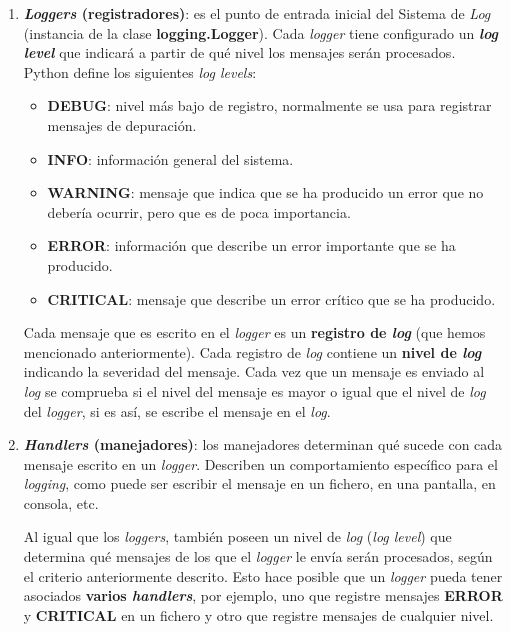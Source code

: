     \begin{enumerate}
        \item \textbf{\textit{Loggers} (registradores)}: es el punto de entrada inicial del
        Sistema de \textit{Log} (instancia de la clase \textbf{logging.Logger}). Cada
        \textit{logger} tiene configurado un \textbf{\textit{log level}} que indicará a
        partir de qué nivel los mensajes serán procesados. Python define los siguientes
        \textit{log levels}:

            \begin{itemize}
                \item \textbf{DEBUG}: nivel más bajo de registro, normalmente se usa para
                registrar mensajes de depuración.
                \item \textbf{INFO}: información general del sistema.
                \item \textbf{WARNING}: mensaje que indica que se ha producido un error
                que no debería ocurrir, pero que es de poca importancia.
                \item \textbf{ERROR}: información que describe un error importante que se
                ha producido.
                \item \textbf{CRITICAL}: mensaje que describe un error crítico que se
                ha producido.
            \end{itemize}

        Cada mensaje que es escrito en el \textit{logger} es un \textbf{registro de
        \textit{log}} (que hemos mencionado anteriormente). Cada registro de \textit{log}
        contiene un \textbf{nivel de \textit{log}} indicando la severidad del mensaje. Cada
        vez que un mensaje es enviado al \textit{log} se comprueba si el nivel del mensaje
        es mayor o igual que el nivel de \textit{log} del \textit{logger}, si es así, se
        escribe el mensaje en el \textit{log}.

        \item \textbf{\textit{Handlers} (manejadores)}: los manejadores determinan qué sucede con
        cada mensaje escrito en un \textit{logger}. Describen un comportamiento específico
        para el \textit{logging}, como puede ser escribir el mensaje en un fichero, en una
        pantalla, en consola, etc.

        Al igual que los \textit{loggers}, también poseen un nivel de \textit{log}
        (\textit{log level}) que determina qué mensajes de los que el \textit{logger} le
        envía serán procesados, según el criterio anteriormente descrito. Esto hace posible
        que un \textit{logger} pueda tener asociados \textbf{varios \textit{handlers}}, por
        ejemplo, uno que registre mensajes \textbf{ERROR} y \textbf{CRITICAL} en un fichero
        y otro que registre mensajes de cualquier nivel.


\end{enumerate}
